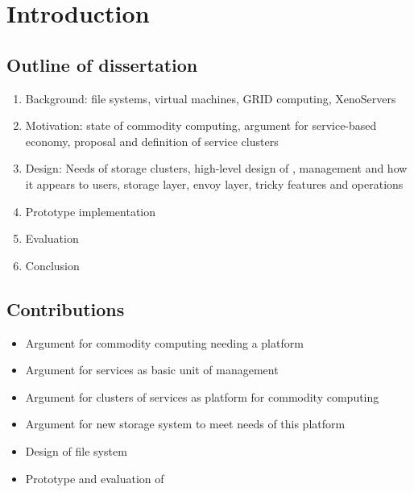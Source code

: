 \chapter{Introduction}

\section{Outline of dissertation}
\begin{enumerate}
\item Background: file systems, virtual machines, GRID computing, XenoServers
\item Motivation: state of commodity computing, argument for service-based economy, proposal and definition of service clusters
\item Design: Needs of storage clusters, high-level design of \envoy, management and how it appears to users, storage layer, envoy layer, tricky features and operations
\item Prototype implementation
\item Evaluation
\item Conclusion
\end{enumerate}

\section{Contributions}
\begin{itemize}
\item Argument for commodity computing needing a platform
\item Argument for services as basic unit of management
\item Argument for clusters of services as platform for commodity computing
\item Argument for new storage system to meet needs of this platform
\item Design of \envoy file system
\item Prototype and evaluation of \envoy
\end{itemize}
